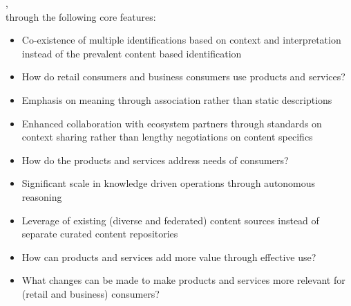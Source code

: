 ,\\
through the following core features:

\begin{description}[font=\bfseries,nosep,leftmargin=!,labelwidth=\widthof{\bfseries UNDERSTAND}]
    \item[SENSE]
        \begin{itemize}[leftmargin=1em]
            \item Co-existence of multiple identifications based on context and interpretation instead of
                  the prevalent content based identification
            \item How do retail consumers and business consumers use products and services?
        \end{itemize}
    \item[UNDERSTAND]
        \begin{itemize}[leftmargin=1em]
            \item Emphasis on meaning through association rather than static descriptions
            \item Enhanced collaboration with ecosystem partners through standards on context sharing
                  rather than lengthy negotiations on content specifics
            \item How do the products and services address needs of consumers?
        \end{itemize}
    \item[DECIDE]
        \begin{itemize}[leftmargin=1em]
            \item Significant scale in knowledge driven operations through autonomous reasoning
            \item Leverage of existing (diverse and federated) content sources instead of
                  separate curated content repositories
            \item How can products and services add more value through effective use?
            \item What changes can be made to make products and services more relevant
                  for (retail and business) consumers?
        \end{itemize}
\end{description}

\label{sec:ekg-maturity-business-identity}

